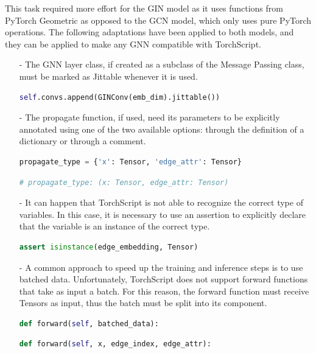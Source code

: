This task required more effort for the GIN model as it uses functions from PyTorch Geometric as opposed to the GCN model, which only uses pure PyTorch operations.
The following adaptations have been applied to both models, and they can be applied to make any GNN compatible with TorchScript.

\begin{itemize}
    \item[-] The GNN layer class, if created as a subclass of the Message Passing class, must be marked as Jittable whenever it is used.
\begin{lstlisting}[language=Python,label={lst:jittable}]
self.convs.append(GINConv(emb_dim).jittable())
\end{lstlisting}
    \item[-] The propagate function, if used, need its parameters to be explicitly annotated using one of the two available options: through the definition of a dictionary or through a comment.
\begin{lstlisting}[language=Python,label={lst:propagate-annotation}]
propagate_type = {'x': Tensor, 'edge_attr': Tensor}
\end{lstlisting}
\begin{lstlisting}[language=Python,label={lst:propagate-annotation-comment}]
# propagate_type: (x: Tensor, edge_attr: Tensor)
\end{lstlisting}
    \item[-] It can happen that TorchScript is not able to recognize the correct type of variables.
    In this case, it is necessary to use an assertion to explicitly declare that the variable is an instance of the correct type.
\begin{lstlisting}[language=Python,label={lst:isinstance-assertion}]
assert isinstance(edge_embedding, Tensor)
\end{lstlisting}
    \item[-] A common approach to speed up the training and inference steps is to use batched data.
    Unfortunately, TorchScript does not support forward functions that take as input a batch.
    For this reason, the forward function must receive Tensors as input, thus the batch must be split into its component.
\begin{lstlisting}[language=Python,label={lst:splitted-forward-before}]
def forward(self, batched_data):
\end{lstlisting}
\begin{lstlisting}[language=Python,label={lst:splitted-forward}]
def forward(self, x, edge_index, edge_attr):

\end{lstlisting}
\end{itemize}
